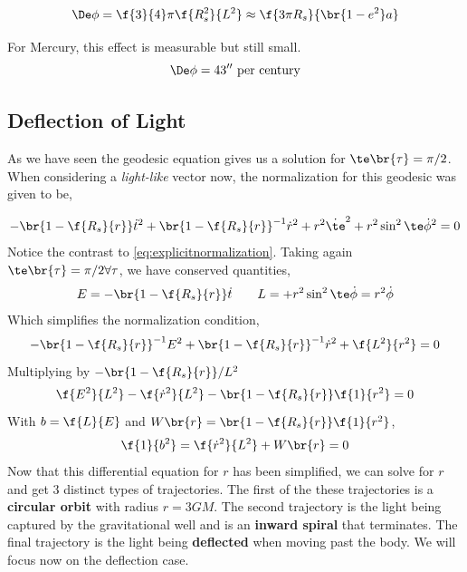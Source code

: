 \documentclass{article}
\begin{document}
\[ \De \phi = \f{3}{4}\pi \f{R_s^2}{L^2} \approx \f{3\pi R_s}{\br{1 - e^2} a} \]

\begin{center}
\end{center}

For Mercury, this effect is measurable but still small.
\[ \De \phi = 43'' \text{ per century} \]

\subsection{Deflection of Light}

As we have seen the geodesic equation gives us a solution for $\te\br{\tau} = \pi/2$. When considering a \textit{light-like} vector now, the normalization for this geodesic was given to be,

\[ -\br{1-\f{R_s}{r}}\dot{t}^2 + \br{1-\f{R_s}{r}}^{-1} \dot{r}^2 + r^2 \dot{\te}^2 + r^2 \sin^2 \te \dot{\phi}^2 = 0 \]
Notice the contrast to \eqref{eq:explicitnormalization}. Taking again $\te\br{\tau} = \pi/2 \forall \tau$, we have conserved quantities,
\[ E = - \br{1 - \f{R_s}{r}} \dot{t} \qquad L = + r^2 \sin^2 \te \dot{\phi} = r^2 \dot{\phi}\]
Which simplifies the normalization condition,
\[ - \br{1 - \f{R_s}{r}}^{-1} E^2 + \br{1 - \f{R_s}{r}}^{-1} \dot{r}^2 + \f{L^2}{r^2} = 0\]
Multiplying by $- \br{1 - \f{R_s}{r}} / L^2$
\[ \f{E^2}{L^2} - \f{\dot{r}^2}{L^2} - \br{1 - \f{R_s}{r}} \f{1}{r^2} = 0\]
With $b = \f{L}{E}$ and $W\br{r} =\br{1 - \f{R_s}{r}} \f{1}{r^2} $,
\[ \f{1}{b^2} =  \f{\dot{r}^2}{L^2} + W \br{r} = 0\]
Now that this differential equation for $r$ has been simplified, we can solve for $r$ and get 3 distinct types of trajectories. The first of the these trajectories is a \textbf{circular orbit} with radius $r = 3GM$. The second trajectory is the light being captured by the gravitational well and is an \textbf{inward spiral} that terminates. The final trajectory is the light being \textbf{deflected} when moving past the body. We will focus now on the deflection case.
\end{document}
